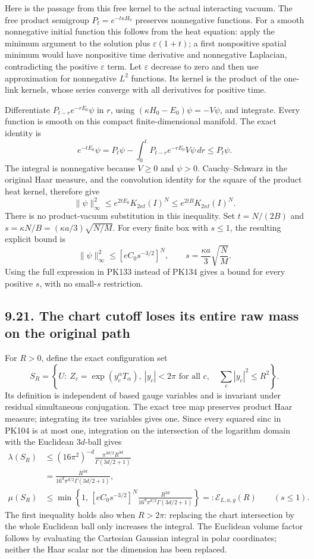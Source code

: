 \documentclass[11pt]{article}
\begin{document}
Here is the passage from this free kernel to the actual interacting
vacuum. The free product semigroup \(P_t=e^{-t\kappa H_0}\) preserves
nonnegative functions. For a smooth nonnegative initial function this
follows from the heat equation: apply the minimum argument to the
solution plus \(\varepsilon(1+t)\); a first nonpositive spatial minimum
would have nonpositive time derivative and nonnegative Laplacian,
contradicting the positive \(\varepsilon\) term. Let \(\varepsilon\)
decrease to zero and then use approximation for nonnegative \(L^2\)
functions. Its kernel is the product of the one-link kernels, whose
series converge with all derivatives for positive time.

Differentiate \(P_{t-r}e^{-rE_0}\psi\) in \(r\), using
\((\kappa H_0-E_0)\psi=-V\psi\), and integrate. Every function is
smooth on this compact finite-dimensional manifold. The exact identity is
\[
 e^{-tE_0}\psi
 =P_t\psi-\int_0^tP_{t-r}e^{-rE_0}V\psi\,dr
 \le P_t\psi .
\]
The integral is nonnegative because \(V\ge0\) and \(\psi>0\).
Cauchy–Schwarz in the original Haar measure, and the convolution
identity for the square of the product heat kernel, therefore give
\[
 \|\psi\|_\infty^2
 \le e^{2tE_0}K_{2\kappa t}(I)^N
 \le e^{2tB}K_{2\kappa t}(I)^N .
 \tag{PK135}
\]
There is no product-vacuum substitution in this inequality.
Set \(t=N/(2B)\) and \(s=\kappa N/B=(\kappa a/3)\sqrt{N/M}\).
For every finite box with \(s\le1\), the resulting explicit bound is
\[
 \|\psi\|_\infty^2
 \le [eC_0s^{-3/2}]^N,\qquad
 s=\frac{\kappa a}{3}\sqrt{\frac NM}.
 \tag{PK136}
\]
Using the full expression in PK133 instead of PK134 gives a bound
for every positive \(s\), with no small-\(s\) restriction.

\subsection*{9.21. The chart cutoff loses its entire raw mass on the original path}

For \(R>0\), define the exact configuration set
\[
 S_R=\left\{U:\ Z_c=\exp(y_c^\alpha T_\alpha),\
 |y_c|<2\pi\text{ for all }c,\quad
 \sum_c|y_c|^2\le R^2\right\}.
\]
Its definition is independent of based gauge variables and is invariant
under residual simultaneous conjugation. The exact tree map preserves
product Haar measure; integrating its tree variables gives one.
Since every squared sinc in PK104 is at most one, integration on the
intersection of the logarithm domain with the Euclidean \(3d\)-ball gives
\[
 \begin{split}
 \lambda(S_R)
 &\le (16\pi^2)^{-d}
        \frac{\pi^{3d/2}R^{3d}}{\Gamma(3d/2+1)}\\
 &=\frac{R^{3d}}{16^d\pi^{d/2}\Gamma(3d/2+1)},\\
 \mu(S_R)&\le
 \min\left\{1,\,
 [eC_0s^{-3/2}]^N
 \frac{R^{3d}}{16^d\pi^{d/2}\Gamma(3d/2+1)}\right\}
 =:\mathcal E_{L,a,g}(R)
 \qquad(s\le1).
 \end{split}\tag{PK137}
\]
The first inequality holds also when \(R>2\pi\): replacing the chart
intersection by the whole Euclidean ball only increases the integral.
The Euclidean volume factor follows by evaluating the Cartesian Gaussian
integral in polar coordinates; neither the Haar scalar nor the dimension
has been replaced.
\end{document}
